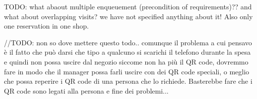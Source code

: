 TODO: what abaout multiple enqueuement (precondition of requirements)?? and what about overlapping visits? we have not specified anything about it! Also only one reservation in one shop.

//TODO: non so dove mettere questo todo.. comunque il problema a cui pensavo è il fatto che può darsi che tipo a qualcuno si scarichi il telefono durante la spesa e quindi non possa uscire dal negozio siccome non ha più il QR code, dovremmo fare in modo che il manager possa farli uscire con dei QR code speciali, o meglio che possa reperire i QR code di una persona che lo richiede. Basterebbe fare che i QR code sono legati alla persona e fine dei problemi...
%
%
%
%
%
